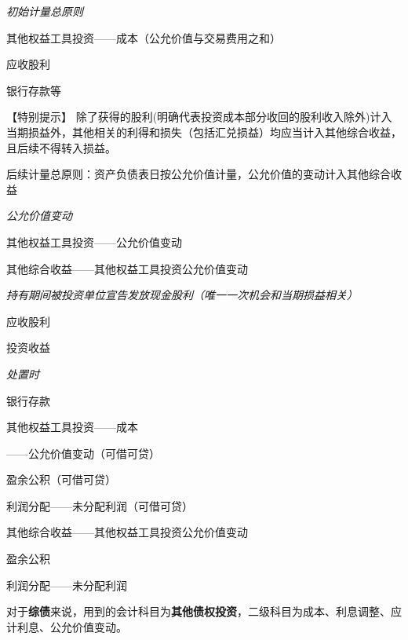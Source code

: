 \documentclass[UTF8,12pt]{ctexart}
\newenvironment{Dr}{%
	\begin{list}{}%
		{
			\setlength{\leftmargin}{2em}
			\setlength{\labelwidth}{2em}
			\setlength{\labelsep}{0pt}
			\setlength{\itemindent}{0pt}
			\setlength{\listparindent}{0pt}
			\setlength{\parsep}{0pt}
			\setlength{\topsep}{0pt}
		}
		\item[\textbf{借：}]
	}{%
	\end{list}
}
\newenvironment{Cr}{%
	\begin{list}{}%
		{
			\setlength{\leftmargin}{3em}
			\setlength{\labelwidth}{2em}
			\setlength{\labelsep}{0pt}
			\setlength{\itemindent}{0pt}
			\setlength{\listparindent}{0pt}
			\setlength{\parsep}{0pt}
			\setlength{\topsep}{0pt}
		}
		\item[\textbf{贷：}]
	}{%
	\end{list}
}
\numberwithin{equation}{section} %
\numberwithin{figure}{section}
\numberwithin{table}{section}
\begin{document}
	\textit{初始计量总原则}
	
	\begin{Dr}
		其他权益工具投资——成本（公允价值与交易费用之和）
		
		应收股利
	\end{Dr}
	\begin{Cr}
		银行存款等
	\end{Cr}

	【特别提示】
	除了获得的股利(明确代表投资成本部分收回的股利收入除外)计入当期损益外，其他相关的利得和损失（包括汇兑损益）均应当计入其他综合收益，且后续不得转入损益。
	
	后续计量总原则：资产负债表日按公允价值计量，公允价值的变动计入其他综合收益
	
	\textit{公允价值变动}
	
	\begin{Dr}
		其他权益工具投资——公允价值变动
	\end{Dr}
	\begin{Cr}
		其他综合收益——其他权益工具投资公允价值变动
	\end{Cr}


	\textit{持有期间被投资单位宣告发放现金股利（唯一一次机会和当期损益相关）}
	
	\begin{Dr}
		应收股利
	\end{Dr}
	\begin{Cr}
		投资收益
	\end{Cr}

	
	\textit{处置时}
	
	\begin{Dr}
		银行存款
	\end{Dr}
	\begin{Cr}
		其他权益工具投资——成本
		
		——公允价值变动（可借可贷）
		
		盈余公积（可借可贷）
		
		利润分配——未分配利润（可借可贷）
	\end{Cr}
	
	\begin{Dr}
		其他综合收益——其他权益工具投资公允价值变动
	\end{Dr}
	\begin{Cr}
		盈余公积
		
		利润分配——未分配利润
	\end{Cr}
	
	
	对于\textbf{综债}来说，用到的会计科目为\textbf{其他债权投资}，二级科目为成本、利息调整、应计利息、公允价值变动。
	
\end{document}

